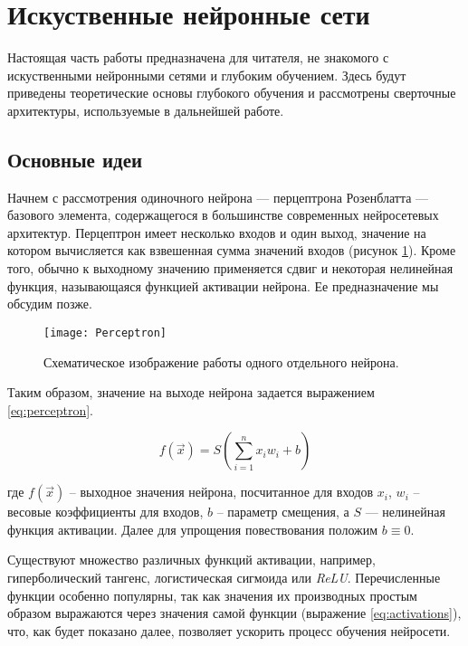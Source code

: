 \section{Искуственные нейронные сети}

\indent
\indent
Настоящая часть работы предназначена для читателя, не знакомого с 
искуственными нейронными сетями и глубоким обучением. 
Здесь будут приведены теоретические 
основы глубокого обучения и рассмотрены сверточные архитектуры, 
используемые в дальнейшей работе.

\subsection{Основные идеи}

\indent
\indent
Начнем с рассмотрения одиночного нейрона
 --- перцептрона Розенблатта --- базового элемента, содержащегося в большинстве современных нейросетевых архитектур.
Перцептрон имеет несколько входов и один выход, значение на котором
вычисляется как взвешенная сумма значений входов 
(рисунок \ref{tikzpicture: perceptron}).
Кроме того, обычно
к выходному значению применяется сдвиг и некоторая нелинейная функция, 
называющаяся функцией активации нейрона. Ее предназначение мы обсудим позже.

\begin{figure}[h!]
    \begin{center}
   	    \texttt{[image: Perceptron]}
   	\end{center}
   	\caption{Схематическое изображение работы одного отдельного нейрона.}
   	\label{tikzpicture: perceptron}
\end{figure}


\indent
\indent
Таким образом, значение на выходе нейрона задается
 выражением \ref{eq:perceptron}.

\begin{equation}\label{eq:perceptron}
    f(\vec{x}) = S(\sum_{i=1}^n x_i w_i + b)
\end{equation}


где $f(\vec{x})$ -- выходное значения нейрона, посчитанное для входов $x_i$,
$w_i$ -- весовые коэффициенты для входов, $b$ -- параметр смещения, 
а $S$ --- нелинейная функция активации. Далее для упрощения повествования
положим $b \equiv 0$.

\indent
\indent
Существуют множество различных функций активации, например, гиперболический
тангенс, логистическая сигмоида или \textit{ReLU}. Перечисленные
функции особенно популярны, так как значения их производных простым образом 
выражаются через значения самой функции (выражение \ref{eq:activations}), 
что, как будет показано далее, позволяет
ускорить процесс обучения нейросети.


